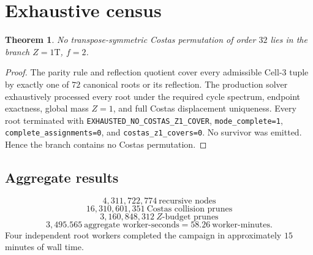 \documentclass[11pt,a4paper]{article}
\newtheorem{theorem}{Theorem}[section]
\theoremstyle{definition}\newtheorem{definition}[theorem]{Definition}
\theoremstyle{remark}\newtheorem{remark}[theorem]{Remark}
\newcommand{\code}[1]{\texttt{#1}}
\begin{document}
\section{Exhaustive census}
\begin{theorem}
No transpose-symmetric Costas permutation of order $32$ lies in the branch $Z=1\mathrm T$, $f=2$.
\end{theorem}
\begin{proof}
The parity rule and reflection quotient cover every admissible Cell-3 tuple by exactly one of $72$ canonical roots or its reflection. The production solver exhaustively processed every root under the required cycle spectrum, endpoint exactness, global mass $Z=1$, and full Costas displacement uniqueness. Every root terminated with \code{EXHAUSTED\_NO\_COSTAS\_Z1\_COVER}, \code{mode\_complete=1}, \code{complete\_assignments=0}, and \code{costas\_z1\_covers=0}. No survivor was emitted. Hence the branch contains no Costas permutation.
\end{proof}

\subsection{Aggregate results}
\[
\boxed{4{,}311{,}722{,}774\ \text{recursive nodes}}
\]
\[
\boxed{16{,}310{,}601{,}351\ \text{Costas collision prunes}}
\]
\[
\boxed{3{,}160{,}848{,}312\ Z\text{-budget prunes}}
\]
\[
\boxed{3{,}495.565\ \text{aggregate worker-seconds}=58.26\ \text{worker-minutes}.}
\]
Four independent root workers completed the campaign in approximately $15$ minutes of wall time.
\end{document}
